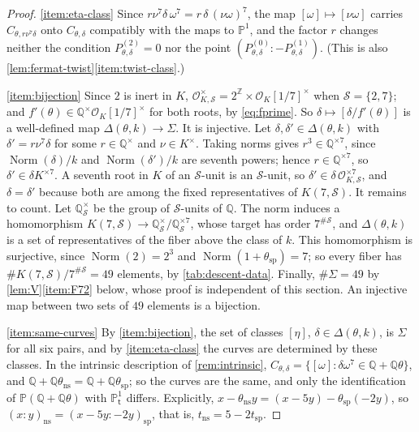\documentclass[12pt]{amsart}
\renewcommand{\P}{\mathbb{P}}
\newcommand{\PP}{{\mathbb P}}
\newcommand{\Q}{\mathbb{Q}}
\newcommand{\Z}{\mathbb{Z}}
\newcommand{\Pone}{\P^{1}}
\newcommand{\calS}{{\mathcal S}}
\newcommand{\OO}{{\mathcal O}}
\newcommand{\OKS}{\OO_{K,\calS}}
\renewcommand{\t}{\mathsf{t}}
\DeclareMathOperator{\ns}{ns}
\DeclareMathOperator{\spc}{sp}
\DeclareMathOperator{\Norm}{Norm}
\numberwithin{equation}{section}
\theoremstyle{definition}
\begin{document}
\begin{proof}
  \eqref{item:eta-class} Since $r\nu^{7}\delta\,\omega^{7} = r\,\delta\,(\nu\omega)^{7}$,
  the map $[\omega] \mapsto [\nu\omega]$ carries $C_{\theta,r\nu^{7}\delta}$ onto
  $C_{\theta,\delta}$ compatibly with the maps to $\Pone$, and the factor $r$
  changes neither the condition $P^{(2)}_{\theta,\delta} = 0$ nor the point
  $(P^{(0)}_{\theta,\delta} : -P^{(1)}_{\theta,\delta})$. (This is also
  \cref{lem:fermat-twist}\eqref{item:twist-class}.)

  \eqref{item:bijection} Since $2$ is inert in $K$,
  $\OKS^{\times} = 2^{\Z} \times \OO_K[1/7]^{\times}$ when $\calS = \{2,7\}$;
  and $f'(\theta) \in \Q^{\times}\OO_K[1/7]^{\times}$ for both roots, by
  \cref{eq:fprime}.
  So $\delta \mapsto [\delta/f'(\theta)]$ is a well-defined map $\Delta(\theta,k) \to \Sigma$.
  It is injective. Let $\delta, \delta' \in \Delta(\theta,k)$ with
  $\delta' = r\nu^{7}\delta$ for some $r \in \Q^{\times}$ and $\nu \in K^{\times}$.
  Taking norms gives $r^{3} \in \Q^{\times 7}$, since $\Norm(\delta)/k$ and
  $\Norm(\delta')/k$ are seventh powers; hence $r \in \Q^{\times 7}$, so
  $\delta' \in \delta K^{\times 7}$. A seventh root in $K$ of an $\calS$-unit
  is an $\calS$-unit, so $\delta' \in \delta\,\OKS^{\times 7}$, and
  $\delta = \delta'$ because both are among the fixed representatives of
  $K(7,\calS)$. It remains to count. Let $\Q_{\calS}^{\times}$ be the group of
  $\calS$-units of $\Q$. The norm induces a homomorphism $K(7,\calS) \to
  \Q_{\calS}^{\times}/\Q_{\calS}^{\times 7}$, whose target has order $7^{\#\calS}$,
  and $\Delta(\theta,k)$ is a set of representatives of the fiber above the class of $k$.
  This homomorphism is surjective, since $\Norm(2) = 2^{3}$ and
  $\Norm(1 + \theta_{\spc}) = 7$; so every fiber has $\#K(7,\calS)/7^{\#\calS} = 49$
  elements, by \cref{tab:descent-data}. Finally, $\#\Sigma = 49$ by
  \cref{lem:V}\eqref{item:F72} below, whose proof is independent of this
  section. An injective map between two sets of $49$ elements is a bijection.

  \eqref{item:same-curves} By \eqref{item:bijection}, the set of classes
  $[\eta]$, $\delta \in \Delta(\theta,k)$, is $\Sigma$ for all six pairs, and by
  \eqref{item:eta-class} the curves are determined by these classes. In the
  intrinsic description of \cref{rem:intrinsic}, $C_{\theta,\delta} = \{[\omega]
  : \delta\omega^{7} \in \Q + \Q\theta\}$, and $\Q + \Q\theta_{\ns} = \Q +
  \Q\theta_{\spc}$; so the curves are the same, and only the identification of
  $\PP(\Q + \Q\theta)$ with $\Pone_{\t}$ differs. Explicitly, $x - \theta_{\ns}y =
  (x - 5y) - \theta_{\spc}(-2y)$, so $(x : y)_{\ns} = (x - 5y : -2y)_{\spc}$,
  that is, $t_{\ns} = 5 - 2t_{\spc}$.
\end{proof}
\end{document}
